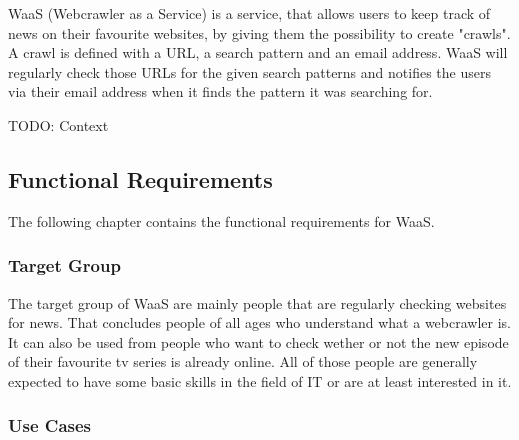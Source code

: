 \documentclass[titlepage, 12pt]{article}
\begin{document}
WaaS (Webcrawler as a Service) is a service, that allows users to keep track of news on their favourite websites, by giving them the possibility to create "crawls". A crawl is defined with a URL, a search pattern and an email address. WaaS will regularly check those URLs for the given search patterns and notifies the users via their email address when it finds the pattern it was searching for.

TODO: Context

\subsection{Functional Requirements}

The following chapter contains the functional requirements for WaaS.

\subsubsection{Target Group}

The target group of WaaS are mainly people that are regularly checking websites for news. That concludes people of all ages who understand what a webcrawler is. It can also be used from people who want to check wether or not the new episode of their favourite tv series is already online. All of those people are generally expected to have some basic skills in the field of IT or are at least interested in it.

\subsubsection{{Use Cases}}
\end{document}

